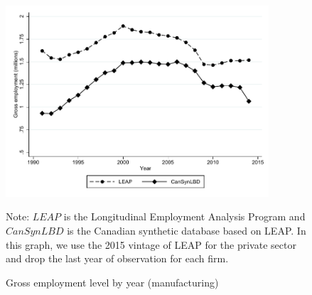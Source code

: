 \documentclass{article}
\begin{document}
\begin{figure} [H]
\centering
\caption{Gross employment level by year (manufacturing)} \label{GrossEmploymentManufacturing}
\includegraphics[height=2.8in, width=.7\linewidth]{graphs/Gross_employment_level_by_year_manufacturing_bw.pdf} 
\begin{minipage}{0.85\textwidth}
{\footnotesize Note: $LEAP$ is the Longitudinal Employment Analysis Program and $CanSynLBD$ is the Canadian synthetic database based on LEAP. In this graph, we use the 2015 vintage of LEAP for the private sector and drop the last year of observation for each firm. \par}
\end{minipage}
\end{figure}
\end{document}
